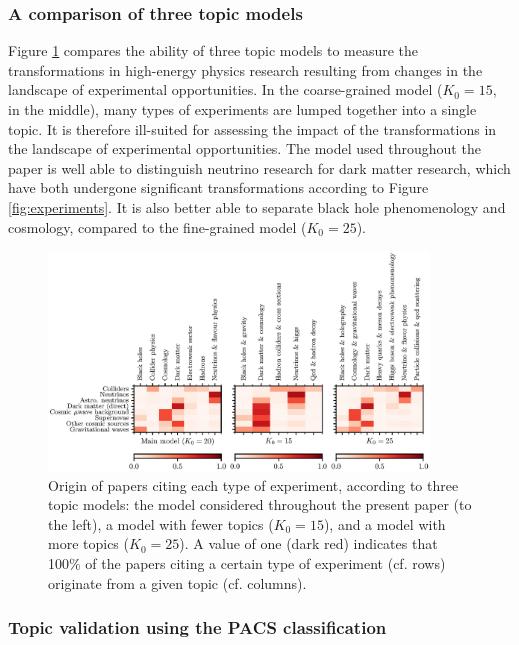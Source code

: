 \documentclass{article}
\begin{document}
\subsubsection{\label{appendix:topic_comparison}A comparison of three topic models}

Figure \ref{fig:topic_experiments} compares the ability of three topic models to measure the transformations in high-energy physics research resulting from changes in the landscape of experimental opportunities. 
In the coarse-grained model ($K_0=15$, in the middle), many types of experiments are lumped together into a single topic. It is therefore ill-suited for assessing the impact of the transformations in the landscape of experimental opportunities. The model used throughout the paper is well able to distinguish neutrino research for dark matter research, which have both undergone significant transformations according to Figure \ref{fig:experiments}. It is also better able to separate black hole phenomenology and cosmology, compared to the fine-grained model ($K_0=25$). 

\begin{figure}[H]
    \centering
    \includegraphics[width=0.9\textwidth]{Fig14}
    \caption{\label{fig:topic_experiments}Origin of papers citing each type of experiment, according to three topic models: the model considered throughout the present paper (to the left), a model with fewer topics ($K_0=15$), and a model with more topics ($K_0=25$). A value of one (dark red) indicates that 100\% of the papers citing a certain type of experiment (cf. rows) originate from a given topic (cf. columns).}
\end{figure}

\subsubsection{\label{appendix:pacs_validation}Topic validation using the PACS classification}
\end{document}
